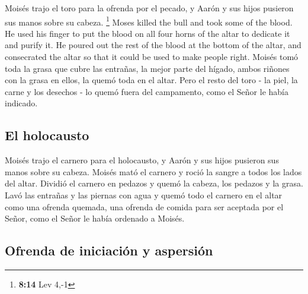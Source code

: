  Moisés trajo el toro para la ofrenda por el pecado, y
Aarón y sus hijos pusieron sus manos sobre su cabeza. \footnote{\textbf{8:14}
  Lev 4,-1}  Moses killed the bull and took some of the
blood. He used his finger to put the blood on all four horns of the
altar to dedicate it and purify it. He poured out the rest of the blood
at the bottom of the altar, and consecrated the altar so that it could
be used to make people right.  Moisés tomó toda la grasa
que cubre las entrañas, la mejor parte del hígado, ambos riñones con la
grasa en ellos, la quemó toda en el altar.  Pero el resto
del toro - la piel, la carne y los desechos - lo quemó fuera del
campamento, como el Señor le había indicado.

\hypertarget{el-holocausto}{%
\subsection{El holocausto}\label{el-holocausto}}

 Moisés trajo el carnero para el holocausto, y Aarón y
sus hijos pusieron sus manos sobre su cabeza.  Moisés
mató el carnero y roció la sangre a todos los lados del altar.
 Dividió el carnero en pedazos y quemó la cabeza, los
pedazos y la grasa.  Lavó las entrañas y las piernas con
agua y quemó todo el carnero en el altar como una ofrenda quemada, una
ofrenda de comida para ser aceptada por el Señor, como el Señor le había
ordenado a Moisés.

\hypertarget{ofrenda-de-iniciaciuxf3n-y-aspersiuxf3n}{%
\subsection{Ofrenda de iniciación y
aspersión}\label{ofrenda-de-iniciaciuxf3n-y-aspersiuxf3n}}

